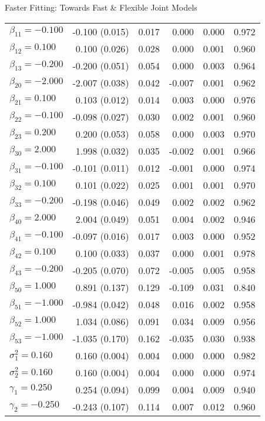 \begin{chapter}{\label{cha:flexible}Faster Fitting: Towards Fast \& Flexible Joint Models}
\begin{table}[ht]
\begin{tabular}{l|rrrrr}
  $\beta_{11}=-0.100$ & -0.100 (0.015) & 0.017 &  0.000 & 0.000 & 0.972 \\ 
  $\beta_{12}= 0.100$ &  0.100 (0.026) & 0.028 &  0.000 & 0.001 & 0.960 \\ 
  $\beta_{13}=-0.200$ & -0.200 (0.051) & 0.054 &  0.000 & 0.003 & 0.964 \\ 
  $\beta_{20}=-2.000$ & -2.007 (0.038) & 0.042 & -0.007 & 0.001 & 0.962 \\ 
  $\beta_{21}= 0.100$ &  0.103 (0.012) & 0.014 &  0.003 & 0.000 & 0.976 \\ 
  $\beta_{22}=-0.100$ & -0.098 (0.027) & 0.030 &  0.002 & 0.001 & 0.960 \\ 
  $\beta_{23}= 0.200$ &  0.200 (0.053) & 0.058 &  0.000 & 0.003 & 0.970 \\ 
  $\beta_{30}= 2.000$ &  1.998 (0.032) & 0.035 & -0.002 & 0.001 & 0.966 \\ 
  $\beta_{31}=-0.100$ & -0.101 (0.011) & 0.012 & -0.001 & 0.000 & 0.974 \\ 
  $\beta_{32}= 0.100$ &  0.101 (0.022) & 0.025 &  0.001 & 0.001 & 0.970 \\ 
  $\beta_{33}=-0.200$ & -0.198 (0.046) & 0.049 &  0.002 & 0.002 & 0.962 \\ 
  $\beta_{40}= 2.000$ &  2.004 (0.049) & 0.051 &  0.004 & 0.002 & 0.946 \\ 
  $\beta_{41}=-0.100$ & -0.097 (0.016) & 0.017 &  0.003 & 0.000 & 0.952 \\ 
  $\beta_{42}= 0.100$ &  0.100 (0.033) & 0.037 &  0.000 & 0.001 & 0.978 \\ 
  $\beta_{43}=-0.200$ & -0.205 (0.070) & 0.072 & -0.005 & 0.005 & 0.958 \\ 
  $\beta_{50}= 1.000$ &  0.891 (0.137) & 0.129 & -0.109 & 0.031 & 0.840 \\ 
  $\beta_{51}=-1.000$ & -0.984 (0.042) & 0.048 &  0.016 & 0.002 & 0.958 \\ 
  $\beta_{52}= 1.000$ &  1.034 (0.086) & 0.091 &  0.034 & 0.009 & 0.956 \\ 
  $\beta_{53}=-1.000$ & -1.035 (0.170) & 0.162 & -0.035 & 0.030 & 0.938 \\ 
  $\sigma^2_1= 0.160$ &  0.160 (0.004) & 0.004 &  0.000 & 0.000 & 0.982 \\ 
  $\sigma^2_2= 0.160$ &  0.160 (0.004) & 0.004 &  0.000 & 0.000 & 0.974 \\ 
  $\gamma_1= 0.250$ &  0.254 (0.094) & 0.099 &  0.004 & 0.009 & 0.940 \\ 
  $\gamma_2=-0.250$ & -0.243 (0.107) & 0.114 &  0.007 & 0.012 & 0.960 \\ 

\end{tabular}
\end{table}
\end{chapter}
